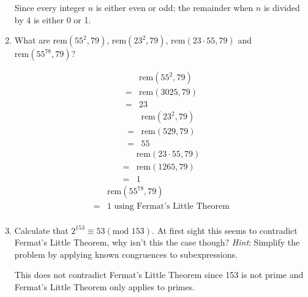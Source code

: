 \documentclass[10pt,\jkfside,a4paper]{article}
\begin{document}
\begin{enumerate}
\begin{center}
Since every integer $n$ is either even or odd; the remainder when $n$ is divided by 4 is either 0 or 1.
\end{center}

\item What are $\text{rem}(55^2, 79)$, $\text{rem}(23^2, 79)$, $\text{rem}(23\cdot 55, 79)$ and $\text{rem}(55^{78}, 79)$?

\begin{equation}
\begin{split}
&\text{rem}(55^2, 79)\\
=&\text{rem}(3025, 79)\\
=&23
\end{split}
\end{equation}
\begin{equation}
\begin{split}
&\text{rem}(23^2, 79)\\
=&\text{rem}(529, 79)\\
=& 55
\end{split}
\end{equation}
\begin{equation}
\begin{split}
&\text{rem}(23 \cdot 55, 79)\\
=&\text{rem}(1265, 79)\\
=& 1
\end{split}
\end{equation}
\begin{equation}
\begin{split}
&\text{rem}(55^{78}, 79)\\
=& 1\text{ using Fermat's Little Theorem}\\
\end{split}
\end{equation}

\item Calculate that $2^{153} \equiv 53(\text{mod } 153)$. At first sight this seems to contradict Fermat's Little Theorem, 
why isn't this the case though? \textit{Hint}: Simplify the problem by applying known congruences to subexpressions.

This does not contradict Fermat's Little Theorem since 153 is not prime and Fermat's Little Theorem only applies to primes.


\end{enumerate}
\end{document}
